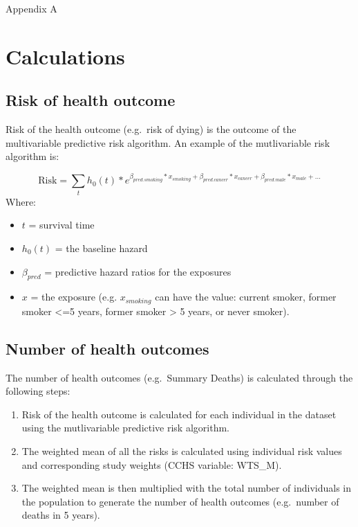 \documentclass[]{book}
\providecommand{\tightlist}{%
  \setlength{\itemsep}{0pt}\setlength{\parskip}{0pt}}
\begin{document}
Appendix A

\section{Calculations}\label{calculations}

\subsection{Risk of health outcome}\label{risk-of-health-outcome}

Risk of the health outcome (e.g.~risk of dying) is the outcome of the
multivariable predictive risk algorithm. An example of the mutlivariable
risk algorithm is:

\[ \text{Risk} = \sum_t h_0(t) * e^{\beta_{pred.smoking}*x_{smoking}+\beta_{pred.cancer}*x_{cancer} + \beta_{pred.male}*x_{male} +...}  \]
Where:

\begin{itemize}
\tightlist
\item
  \(t\) = survival time
\item
  \(h_0(t)\) = the baseline hazard
\item
  \(\beta_{pred}\) = predictive hazard ratios for the exposures
\item
  \(x\) = the exposure (e.g. \(x_{smoking}\) can have the value: current
  smoker, former smoker \textless{}=5 years, former smoker
  \textgreater{} 5 years, or never smoker).
\end{itemize}

\subsection{Number of health outcomes}\label{number-of-health-outcomes}

The number of health outcomes (e.g.~Summary Deaths) is calculated
through the following steps:

\begin{enumerate}
\def\labelenumi{\arabic{enumi}.}
\tightlist
\item
  Risk of the health outcome is calculated for each individual in the
  dataset using the mutlivariable predictive risk algorithm.
\item
  The weighted mean of all the risks is calculated using individual risk
  values and corresponding study weights (CCHS variable: WTS\_M).
\item
  The weighted mean is then multiplied with the total number of
  individuals in the population to generate the number of health
  outcomes (e.g.~number of deaths in 5 years).
\end{enumerate}
\end{document}
